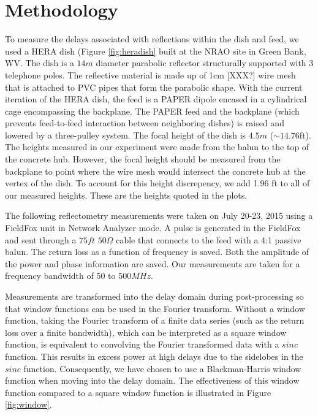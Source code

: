 \documentclass[12pt,preprint]{aastex}
\begin{document}
\section{Methodology}{\label{sec:methods}}

To measure the delays associated with reflections within the dish and feed, we
used a HERA dish (Figure \ref{fig:heradish} built at the NRAO site in Green
Bank, WV. The dish is a $14m$ diameter parabolic reflector structurally
supported with 3 telephone poles. The reflective material is made up of 1cm
[XXX?] wire
mesh that is attached to PVC pipes that form the parabolic shape. With the
current iteration of the HERA dish, the feed is a PAPER dipole encased in a cylindrical cage
encompassing the backplane. The PAPER feed and the backplane (which prevents
feed-to-feed interaction between neighboring dishes) is raised and lowered by a
three-pulley system. The focal height of the dish is $4.5m$ ($\sim{14.76}$ft).
The heights measured in our experiment were made from the balun to the top of
the concrete hub. However, the focal height should be measured from the
backplane to point where the wire mesh would intersect the concrete hub at the
vertex of the dish. To account for this height discrepency, we add 1.96 ft to
all of our measured heights. These are the heights quoted in the plots.

The following reflectometry measurements were taken on July 20-23, 2015 using a
FieldFox unit in Network Analyzer mode. A pulse is generated in the FieldFox
and sent through a $75ft$ $50\Omega$ cable that connects to the feed with a 4:1
passive balun. The return loss as a function of frequency is saved. Both
the amplitude of the power and phase information are saved. Our
measurements are taken for a frequency bandwidth of $50$ to $500MHz$. 

Measurements are transformed into the delay domain during post-processing so that window functions
can be used in the Fourier transform. Without a window function, taking the Fourier transform of a finite data series (such as the return loss over a finite bandwidth), which can be interpreted as a square window function, is equivalent to convolving the Fourier transformed data with a $sinc$ function. This results in excess power at high delays due to the sidelobes in the $sinc$ function. Consequently, we have chosen to use a Blackman-Harris window function when moving into the delay domain. The effectiveness of this window function compared to a square window function is illustrated in Figure \ref{fig:window}.
\end{document}
